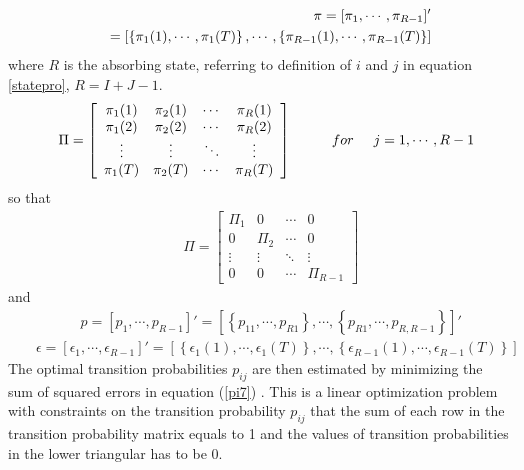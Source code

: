 \documentclass[Journal]{ascelike}
\begin{document}
\begin{eqnarray}
 &  & \pi=[\pi_{1},\cdots,\pi_{R-1}]'\label{pi3}\\
 &  & \hspace{2mm}=\left[\left\lbrace \pi_{1}(1),\cdots,\pi_{1}(T)\right\rbrace ,\cdots,\left\lbrace \pi_{R-1}(1),\cdots,\pi_{R-1}(T)\right\rbrace \right]\label{pi31}
\end{eqnarray}
where $R$ is the absorbing state, referring to definition of $i$
and $j$ in equation \eqref{statepro}, $R=I+J-1$. 
\begin{eqnarray}
 &  & \Pi=\left[{\begin{array}{cccc}
{{\pi_{1}}(1)} & {{\pi_{2}}(1)} & \cdots & {{\pi_{R}}(1)}\\
{{\pi_{1}}(2)} & {{\pi_{2}}(2)} & \cdots & {{\pi_{R}}(2)}\\
\vdots & \vdots & \ddots & \vdots\\
{{\pi_{1}}(T)} & {{\pi_{2}}(T)} & \cdots & {{\pi_{R}}(T)}
\end{array}}\right]\hspace{10mm}for\hspace{5mm}j=1,\cdots,R-1\label{pi4}
\end{eqnarray}
so that 
\begin{eqnarray}
 &  & \Pi=\left[{\begin{array}{cccc}
{\Pi_{1}} & 0 & \cdots & 0\\
0 & {\Pi_{2}} & \cdots & 0\\
\vdots & \vdots & \ddots & \vdots\\
0 & 0 & \cdots & {\Pi_{R-1}}
\end{array}}\right]\label{pi5}
\end{eqnarray}
and 
\begin{eqnarray}
 &  & p=\left[p_{1},\cdots,p_{R-1}\right]'=\left[\left\lbrace p_{11},\cdots,p_{R1}\right\rbrace ,\cdots,\left\lbrace p_{R1},\cdots,p_{R,R-1}\right\rbrace \right]'\label{pi6}
\end{eqnarray}
\begin{eqnarray}
 &  & \epsilon=\left[\epsilon_{1},\cdots,\epsilon_{R-1}\right]'=\left[\left\lbrace \epsilon_{1}(1),\cdots,\epsilon_{1}(T)\right\rbrace ,\cdots,\left\lbrace \epsilon_{R-1}(1),\cdots,\epsilon_{R-1}(T)\right\rbrace \right]\label{pi7}
\end{eqnarray}
The optimal transition probabilities $p_{ij}$ are then estimated
by minimizing the sum of squared errors in equation (\ref{pi7}) \cite{Lee1972}.
This is a linear optimization problem with constraints on the transition
probability $p_{ij}$ that the sum of each row in the transition probability
matrix equals to 1 and the values of transition probabilities in the
lower triangular has to be 0.
\end{document}
